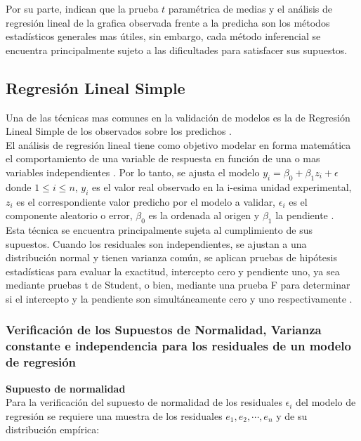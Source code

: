 Por su parte, \textcite{mayer-butler-1993} indican que la prueba $t$ paramétrica de medias y el análisis de regresión lineal de la grafica observada frente a la predicha son los métodos estadísticos generales mas útiles, sin embargo, cada método inferencial se encuentra principalmente sujeto a las dificultades para satisfacer sus supuestos.\\



\subsection{Regresión Lineal Simple}
Una de las técnicas mas comunes en la validación de modelos es la de Regresión Lineal Simple de los observados sobre los predichos \parencites{analla-1998, mayer-1994, tedeschi-2006}.\\

El análisis de regresión lineal tiene como objetivo modelar en forma matemática el comportamiento de una variable de respuesta en función de una o mas variables independientes \parencite{gutierrez-2012}. Por lo tanto, se ajusta el modelo  $ y_{i} = \beta_{0} + \beta_{1}z_{i} +\epsilon $ donde $ 1 \leq i \leq n$, $ y_{i}$ es el valor real observado en la i-esima unidad experimental, $ z_{i}$ es el correspondiente valor predicho por el modelo a validar, $\epsilon_{i}$ es el componente aleatorio o error, $\beta_{0}$ es la ordenada al origen y $\beta_{1}$ la pendiente \parencite{zacarias-2023}.\\

Esta técnica se encuentra principalmente sujeta al cumplimiento de sus supuestos. Cuando los residuales son independientes, se ajustan a una distribución normal y tienen varianza común, se aplican pruebas de hipótesis estadísticas para evaluar la exactitud, intercepto cero y pendiente uno, ya sea mediante pruebas t de Student, o bien, mediante una prueba F para determinar si el intercepto y la pendiente son simultáneamente cero y uno respectivamente \parencite{balam-2012}.


\subsubsection{Verificación de los Supuestos de Normalidad, Varianza constante e independencia para los residuales de un modelo de regresión}


\textbf{Supuesto de normalidad}\\

Para la verificación del supuesto de normalidad de los residuales $\epsilon_i$ del modelo de regresión se requiere una muestra de los residuales $e_1, e_2, \cdots, e_n$ y de su distribución empírica:\\


